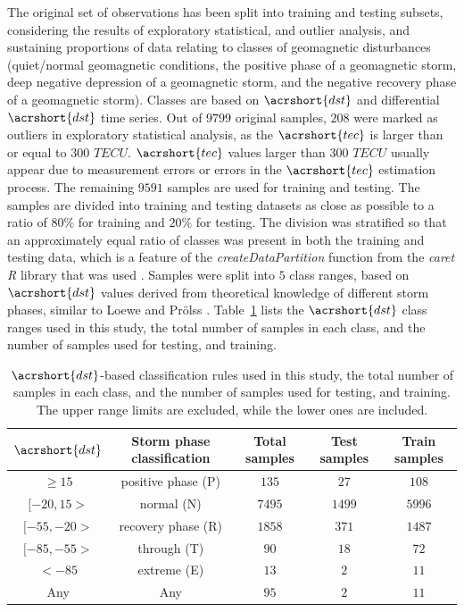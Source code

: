 \let\LaTeXcline\cline\documentclass[sn-mathphys-num]{sn-jnl}\let\cline\LaTeXcline
\begin{document}
The original set of observations has been split into training and testing subsets, considering the results of exploratory statistical, and outlier analysis, and sustaining proportions of data relating to classes of geomagnetic disturbances (quiet/normal geomagnetic conditions, the positive phase of a geomagnetic storm, deep negative depression of a geomagnetic storm, and the negative recovery phase of a geomagnetic storm). Classes are based on $\acrshort{dst}$ and differential $\acrshort{dst}$ time series. Out of $9799$ original samples, $208$ were marked as outliers in exploratory statistical analysis, as the $\acrshort{tec}$ is larger than or equal to $300$ $TECU$. $\acrshort{tec}$ values larger than $300$ $TECU$ usually appear due to measurement errors or errors in the $\acrshort{tec}$ estimation process. The remaining $9591$ samples are used for training and testing. The samples are divided into training and testing datasets as close as possible to a ratio of $80\%$ for training and $20\%$ for testing. The division was stratified so that an approximately equal ratio of classes was present in both the training and testing data, which is a feature of the \textit{createDataPartition} function from the \textit{caret} \textit{R} library that was used \cite{Kuhn2007, kuhn2008building}. Samples were split into $5$ class ranges, based on $\acrshort{dst}$ values derived from theoretical knowledge of different storm phases, similar to Loewe and Prölss \cite{loewe1997classification}. Table~\ref{tab:Dstranges} lists the $\acrshort{dst}$ class ranges used in this study, the total number of samples in each class, and the number of samples used for testing, and training.

\begin{table}[!ht]
    \centering
    \caption{$\acrshort{dst}$-based classification rules used in this study, the total number of samples in each class, and the number of samples used for testing, and training. The upper range limits are excluded, while the lower ones are included.}
    \label{tab:Dstranges}
    \begin{tabular}{|c|c|c|c|c|}
        \hline
        $\acrshort{dst}$ & Storm phase classification & Total samples & Test samples & Train samples \\ \hline
        $ \geq 15 $ & positive phase (P) & $135$ & $27$ & $108$ \\ \hline
        $[-20, 15>$ & normal (N) & $7495$ & $1499$ & $5996$ \\ \hline
        $[-55, -20>$ & recovery phase (R) & $1858$ & $371$ & $1487$ \\ \hline
        $[-85, -55>$ & through (T) & $90$ & $18$ & $72$ \\ \hline
        $ < -85$ & extreme (E) & $13$ & $2$ & $11$ \\ \hline
        Any & Any & $95$ & $2$ & $11$ \\ \hline
    \end{tabular}
\end{table}
\end{document}
